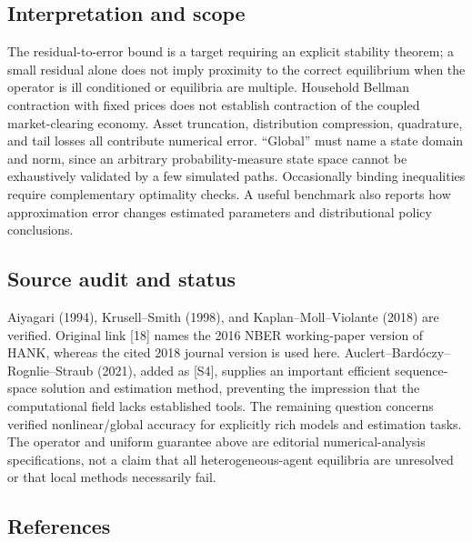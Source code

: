 \documentclass[11pt,a4paper]{article}
\begin{document}
\subsection*{Interpretation and scope}

The residual-to-error bound is a target requiring an explicit stability theorem; a small residual alone does not imply proximity to the correct equilibrium when the operator is ill conditioned or equilibria are multiple. Household Bellman contraction with fixed prices does not establish contraction of the coupled market-clearing economy. Asset truncation, distribution compression, quadrature, and tail losses all contribute numerical error. ``Global'' must name a state domain and norm, since an arbitrary probability-measure state space cannot be exhaustively validated by a few simulated paths. Occasionally binding inequalities require complementary optimality checks. A useful benchmark also reports how approximation error changes estimated parameters and distributional policy conclusions.

\subsection*{Source audit and status}

Aiyagari (1994), Krusell--Smith (1998), and Kaplan--Moll--Violante (2018) are verified. Original link [18] names the 2016 NBER working-paper version of HANK, whereas the cited 2018 journal version is used here. Auclert--Bardóczy--Rognlie--Straub (2021), added as [S4], supplies an important efficient sequence-space solution and estimation method, preventing the impression that the computational field lacks established tools. The remaining question concerns verified nonlinear/global accuracy for explicitly rich models and estimation tasks. The operator and uniform guarantee above are editorial numerical-analysis specifications, not a claim that all heterogeneous-agent equilibria are unresolved or that local methods necessarily fail.

\subsection*{References}
\end{document}
